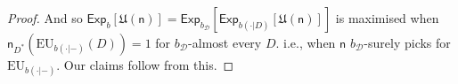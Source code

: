 \documentclass[a4paper,final]{article}
\newcommand\Exp{\mathsf{Exp}}
\newcommand\EU{\mathrm{EU}}
\newcommand\U{\mathfrak{U}} %
\newcommand{\D}{\mathcal{D}}
\newcommand{\Decs}{\mathcal{D}}
\newcommand{\n}{\mathsf{n}}
\renewcommand{\nu}{\n}
\newcommand\SetDelimiter[1][]{
	\nonscript\,#1\vert \allowbreak \nonscript\,\mathopen{}}
\providecommand\given{\SetDelimiter}
\newenvironment{CCM rewritten}
{\begingroup\color{blue}} %
{\endgroup}              %
\begin{document}
\begin{proof}
And so $\Exp_{b}[\U(\n)]=\Exp_{b_\Decs}[\Exp_{b(\cdot | D)}[\U(\n)]]$ is maximised when $\n_{D^*}(\EU_{b(\cdot|-)}(D))=1$ for $b_\Decs$-almost every $D$. 
i.e., when $\n$ $b_\Decs$-surely picks for $\EU_{b(\cdot|-)}$. 
Our claims follow from this.
%
%
%
%
%
%
%
%
%

\end{proof}
\end{document}
